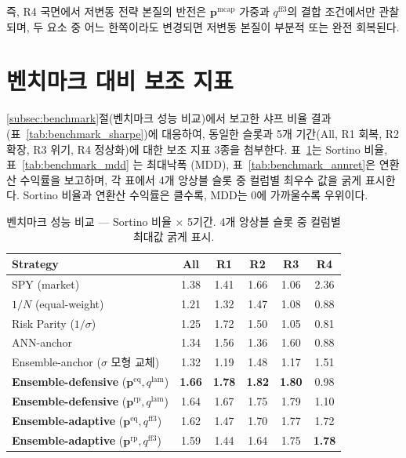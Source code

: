 \documentclass{article}
\begin{document}
즉, R4 국면에서 저변동 전략 본질의 반전은 $\mathbf{p}^{\mathrm{mcap}}$ 가중과 $q^{\mathrm{ff3}}$의 결합 조건에서만 관찰되며, 두 요소 중 어느 한쪽이라도 변경되면 저변동 본질이 부분적 또는 완전 회복된다.

\section{벤치마크 대비 보조 지표}\label{app:benchmark}

\ref{subsec:benchmark}절(벤치마크 성능 비교)에서 보고한 샤프 비율 결과(표~\ref{tab:benchmark_sharpe})에 대응하여, 동일한 슬롯과 5개 기간(All, R1 회복, R2 확장, R3 위기, R4 정상화)에 대한 보조 지표 3종을 첨부한다.  표~\ref{tab:benchmark_sortino}는 Sortino 비율, 표~\ref{tab:benchmark_mdd} 는 최대낙폭 (MDD), 표~\ref{tab:benchmark_annret}은 연환산 수익률을 보고하며, 각 표에서 4개 앙상블 슬롯 중 컬럼별 최우수 값을 굵게 표시한다. Sortino 비율과 연환산 수익률은 클수록, MDD는 0에 가까울수록 우위이다.

\begin{table}[ht]
\centering
\caption{벤치마크 성능 비교 — Sortino 비율 $\times$ 5기간. 4개 앙상블 슬롯 중 컬럼별 최대값 굵게 표시.}
\label{tab:benchmark_sortino}
\setlength{\tabcolsep}{6pt}
\renewcommand{\arraystretch}{1.15}
\small
\begin{tabular}{lccccc}
\toprule
Strategy & All & R1 & R2 & R3 & R4 \\
\midrule
SPY (market)                       & 1.38 & 1.41 & 1.66 & 1.06 & 2.36 \\
$1/N$ (equal-weight)               & 1.21 & 1.32 & 1.47 & 1.08 & 0.88 \\
Risk Parity ($1/\sigma$)           & 1.25 & 1.72 & 1.50 & 1.05 & 0.81 \\
ANN-anchor \citep{pyo2018}         & 1.34 & 1.56 & 1.36 & 1.60 & 0.88 \\
Ensemble-anchor ($\sigma$ 모형 교체) & 1.32 & 1.19 & 1.48 & 1.17 & 1.51 \\
\midrule
\textbf{Ensemble-defensive} ($\mathbf{p}^{\mathrm{eq}}, q^{\mathrm{lam}}$) & \textbf{1.66} & \textbf{1.78} & \textbf{1.82} & \textbf{1.80} & 0.98 \\
\textbf{Ensemble-defensive} ($\mathbf{p}^{\mathrm{rp}}, q^{\mathrm{lam}}$) & 1.64          & 1.67          & 1.75          & 1.79          & 1.10 \\
\textbf{Ensemble-adaptive}  ($\mathbf{p}^{\mathrm{eq}}, q^{\mathrm{ff3}}$) & 1.62          & 1.47          & 1.70          & 1.77          & 1.72 \\
\textbf{Ensemble-adaptive}  ($\mathbf{p}^{\mathrm{rp}}, q^{\mathrm{ff3}}$) & 1.59          & 1.44          & 1.64          & 1.75          & \textbf{1.78} \\
\bottomrule
\end{tabular}
\end{table}
\end{document}
